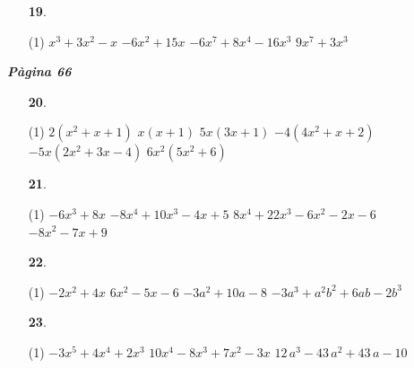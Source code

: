 \documentclass[a4paper, pdf, twoside]{book}
\begin{document}
\begin{multicols}{2}
\begin{enumerate}

 \item[\fontfamily{phv}\selectfont\color{blue}\textbf{19}. ] 
 \begin{tasks}[column-sep=1em, item-indent=1.3333em](1)
	 \task $x^3+3x^2-x$
	 \task $-6x^2+15x$
	 \task $-6x^7+8x^4-16x^3$
	 \task $9x^7+3x^3$
\end{tasks}
 \end{enumerate}
\vspace{0.3cm}


{\textbf{\em Pàgina 66}} \hrulefill
\begin{enumerate}
\vspace{0.25cm}



 \item[\fontfamily{phv}\selectfont\color{blue}\textbf{20}. ] 
 \begin{tasks}[column-sep=1em, item-indent=1.3333em](1)
	 \task $2(x^2+x+1)$
	 \task $x(x+1)$
	 \task $5x(3x+1)$
	 \task $-4(4x^2+x+2)$
	 \task $-5x(2x^2+3x-4)$
	 \task $6x^2(5x^2+6)$
\end{tasks}
 \end{enumerate}
\begin{enumerate}
\vspace{0.25cm}



 \item[\fontfamily{phv}\selectfont\color{blue}\textbf{21}. ] 
 \begin{tasks}[column-sep=1em, item-indent=1.3333em](1)
	 \task $-6x^3+8x$
	 \task $-8x^4+10x^3-4x+5$
	 \task $8x^4+22x^3-6x^2-2x-6$
	 \task $-8x^2-7x+9$
\end{tasks}
\vspace{0.25cm}



 \item[\fontfamily{phv}\selectfont\color{blue}\textbf{22}. ] 
 \begin{tasks}[column-sep=1em, item-indent=1.3333em](1)
	 \task $-2x^2+4x$
	 \task $6x^2-5x-6$
	 \task $-3a^2+10a-8$
	 \task $-3a^3 + a^2b^2+6ab-2b^3$
\end{tasks}
\vspace{0.25cm}



 \item[\fontfamily{phv}\selectfont\color{blue}\textbf{23}. ]  \scalebox{0.6}{\simbolclau } 
 \begin{tasks}[column-sep=1em, item-indent=1.3333em](1)
	 \task $-3x^5+4x^4+2x^3$
	 \task $10x^4-8x^3+7x^2-3x$
	 \task $12\,a^3-43\,a^2+43\,a-10$
\end{tasks}
 \end{enumerate}
\vspace{0.3cm}


\end{multicols}
\end{document}

